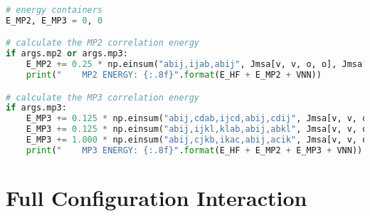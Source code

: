 \raggedbottom\begin{lstlisting}[language=Python, caption={\acrshort{mp2} and \acrshort{mp3} exercise code solution.}, label=code:mp_solution]
# energy containers
E_MP2, E_MP3 = 0, 0

# calculate the MP2 correlation energy
if args.mp2 or args.mp3:
    E_MP2 += 0.25 * np.einsum("abij,ijab,abij", Jmsa[v, v, o, o], Jmsa[o, o, v, v], Emsd**-1, optimize=True)
    print("    MP2 ENERGY: {:.8f}".format(E_HF + E_MP2 + VNN))

# calculate the MP3 correlation energy
if args.mp3:
    E_MP3 += 0.125 * np.einsum("abij,cdab,ijcd,abij,cdij", Jmsa[v, v, o, o], Jmsa[v, v, v, v], Jmsa[o, o, v, v], Emsd**-1, Emsd**-1, optimize=True)
    E_MP3 += 0.125 * np.einsum("abij,ijkl,klab,abij,abkl", Jmsa[v, v, o, o], Jmsa[o, o, o, o], Jmsa[o, o, v, v], Emsd**-1, Emsd**-1, optimize=True)
    E_MP3 += 1.000 * np.einsum("abij,cjkb,ikac,abij,acik", Jmsa[v, v, o, o], Jmsa[v, o, o, v], Jmsa[o, o, v, v], Emsd**-1, Emsd**-1, optimize=True)
    print("    MP3 ENERGY: {:.8f}".format(E_HF + E_MP2 + E_MP3 + VNN))
\end{lstlisting}

\section{\texorpdfstring{Full Configuration Interaction\label{sec:ci_code_solution}}{Full Configuration Interaction}}

